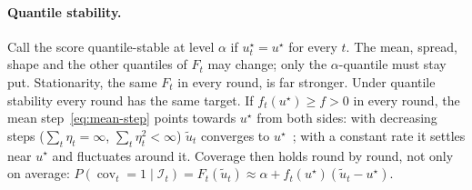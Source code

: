 \documentclass[11pt,a4paper]{article}
\DeclareMathOperator{\cov}{cov}
\theoremstyle{definition}
\theoremstyle{remark}
\begin{document}
\paragraph{Quantile stability.} Call the score quantile-stable at level
$\alpha$ if $u_t^\star=u^\star$ for every $t$. The mean, spread, shape and
the other quantiles of $F_t$ may change; only the $\alpha$-quantile must
stay put. Stationarity, the same $F_t$ in every round, is far stronger.
Under quantile stability every round has the same target. If
$f_t(u^\star)\ge f>0$ in every round, the mean step~\eqref{eq:mean-step}
points towards $u^\star$ from both sides: with decreasing steps
($\sum_t\eta_t=\infty$, $\sum_t\eta_t^2<\infty$) $\tilde u_t$ converges to
$u^\star$~\cite{robbins-monro,tierney}; with a constant rate it settles near
$u^\star$ and fluctuates around it. Coverage then holds round by round, not
only on average: $P(\cov_t=1\mid\mathcal I_t)=F_t(\tilde u_t)\approx
\alpha+f_t(u^\star)(\tilde u_t-u^\star)$.

\end{document}
